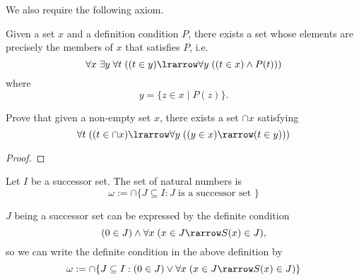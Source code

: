 \documentclass[notoc,notitlepage]{tufte-book}
\begin{document}
We also require the following axiom.

\begin{axiom}
\label{axiom:bounded_separation_axiom}
Given a set $x$ and a definition condition $P$, there exists a set whose elements are precisely the members of $x$ that satisfies $P$, i.e.
  \begin{equation*}
    \forall x \; \exists y \; \forall t \; ( ( t \in y ) \lrarrow \forall y \; ( ( t \in x ) \land P(t) ) )
  \end{equation*}
  where
  \begin{equation*}
    y = \{ z \in x \mid P(z) \}.
  \end{equation*}
\end{axiom}

\begin{ex}
  Prove that given a non-empty set $x$, there exists a set $\cap x$ satisfying
  \begin{equation*}
    \forall t \; ( ( t \in \cap x ) \lrarrow \forall y \; ( ( y \in x ) \rarrow (t \in y) ) )
  \end{equation*}
\end{ex}

\begin{proof}
\end{proof}

\begin{defn}
\label{defn:natural_numbers}
Let $I$ be a successor set. The set of natural numbers is
  \begin{equation*}
    \omega := \cap \{ J \subseteq I : J \text{ is a successor set } \}
  \end{equation*}
\end{defn}

\begin{note}
  $J$ being a successor set can be expressed by the definite condition
  \begin{equation*}
    ( 0 \in J ) \land \forall x \; ( x \in J \rarrow S(x) \in J ),
  \end{equation*}
  so we can write the definite condition in the above definition by
  \begin{equation*}
    \omega := \cap \{ J \subseteq I : ( 0 \in J ) \lor \forall x \; ( x \in J \rarrow S(x) \in J ) \}
  \end{equation*}
\end{note}
\end{document}
